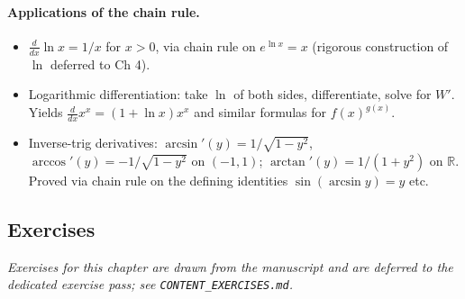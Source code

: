 \paragraph{Applications of the chain rule.}
\begin{itemize}
    \item \(\frac{d}{dx} \ln x = 1/x\) for \(x > 0\), via chain rule on \(e^{\ln x} = x\) (rigorous construction of \(\ln\) deferred to Ch 4).
    \item Logarithmic differentiation: take \(\ln\) of both sides, differentiate, solve for \(W'\). Yields \(\frac{d}{dx} x^{x} = (1 + \ln x) x^{x}\) and similar formulas for \(f(x)^{g(x)}\).
    \item Inverse-trig derivatives: \(\arcsin'(y) = 1/\sqrt{1 - y^{2}}\), \(\arccos'(y) = -1/\sqrt{1 - y^{2}}\) on \((-1, 1)\); \(\arctan'(y) = 1/(1 + y^{2})\) on \(\mathbb{R}\). Proved via chain rule on the defining identities \(\sin(\arcsin y) = y\) etc.
\end{itemize}

\subsection*{Exercises}

\emph{Exercises for this chapter are drawn from the manuscript and are deferred to the dedicated exercise pass; see \texttt{CONTENT\_EXERCISES.md}.}

